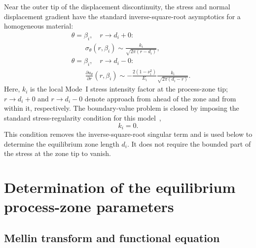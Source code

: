 \documentclass[pdflatex,iicol,sn-mathphys-ay]{sn-jnl}
\begin{document}
Near the outer tip of the displacement discontinuity, the stress and normal
displacement gradient have the standard inverse-square-root asymptotics for a
homogeneous material:
\begin{equation}
\label{eq:zone-tip-asymptotics}
\begin{aligned}
  &\theta=\beta_i,\quad r\to d_i+0:\\[-2pt]
  &\qquad \sigma_\theta(r,\beta_i)
    \sim \frac{k_i}{\sqrt{2\pi(r-d_i)}},\\[3pt]
  &\theta=\beta_i,\quad r\to d_i-0:\\[-2pt]
  &\qquad \frac{\partial u_\theta}{\partial r}(r,\beta_i)
    \sim -\frac{2(1-\nu_i^2)}{E_i}
    \frac{k_i}{\sqrt{2\pi(d_i-r)}}.
\end{aligned}
\end{equation}
Here, $k_i$ is the local Mode~I stress intensity factor at the process-zone
tip; $r\to d_i+0$ and $r\to d_i-0$ denote approach from ahead of the
zone and from within it, respectively. The boundary-value problem is closed by
imposing the standard stress-regularity condition for this
model~\citep{KaminskyDudykPolishchuk2024},
\begin{equation*}
  k_i=0.
\end{equation*}
This condition removes the inverse-square-root singular term and is
used below to determine the equilibrium zone length $d_i$. It does not
require the bounded part of the stress at the zone tip to vanish.


\section{Determination of the equilibrium process-zone parameters}
\label{sec:derivation}

\subsection{Mellin transform and functional equation}
\label{subsec:mellin}
\end{document}
